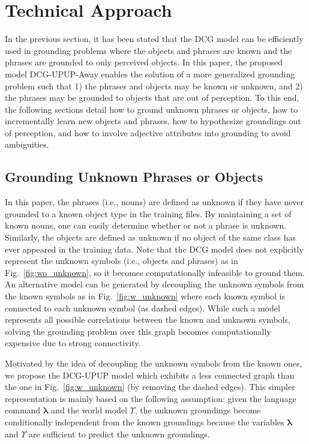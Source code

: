 \section{Technical Approach} \label{sec:technical}
In the previous section, it has been stated that the DCG model can be efficiently used in grounding problems where the objects and phrases are known and the phrases are grounded to only perceived objects. In this paper, the proposed model DCG-UPUP-Away enables the solution of a more generalized grounding problem such that 1) the phrases and objects may be known or unknown, and 2) the phrases may be grounded to objects that are out of perception. To this end, the following sections detail how to ground unknown phrases or objects, how to incrementally learn new objects and phrases, how to hypothesize groundings out of perception, and how to involve adjective attributes into grounding to avoid ambiguities.   

\subsection{Grounding Unknown Phrases or Objects}
In this paper, the phrases (i.e., nouns) are
defined as unknown if they have never grounded to a known
object type in the training files. By maintaining a set of known
nouns, one can easily determine whether or not a
phrase is unknown. Similarly, the objects are defined as unknown
if no object of the same class has ever appeared in the training
data. Note that the DCG model does not explicitly represent the unknown symbols (i.e., objects and phrases) as in Fig.~\ref{fig:wo_unknown}, so it becomes computationally infeasible to ground them. An alternative model can be generated by decoupling the unknown symbols from the known symbols as in Fig.~\ref{fig:w_unknown} where each known symbol is connected to each unknown symbol (as dashed edges). While such a model represents all possible correlations between the known and unknown symbols, solving the grounding problem over this graph becomes computationally expensive due to strong connectivity.  

Motivated by the idea of decoupling the unknown symbols from the known ones, we propose the DCG-UPUP model which exhibits a less connected graph than the one in Fig.~\ref{fig:w_unknown} (by removing the dashed edges). This simpler representation is mainly based on the following assumption: given the language command $\boldsymbol{\lambda}$ and the world model $\Upsilon$, the unknown groundings become conditionally independent from the known groundings because the variables $\boldsymbol\lambda$ and $\Upsilon$ are sufficient to predict the unknown groundings. 

